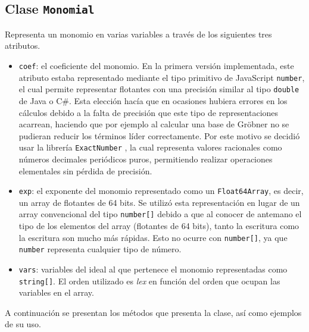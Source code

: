 \subsection{Clase \texttt{Monomial}}
Representa un monomio en varias variables a través de los siguientes tres atributos.
\begin{itemize}
    \item \texttt{coef}: el coeficiente del monomio. En la primera versión implementada, este atributo estaba representado mediante el tipo primitivo de JavaScript \texttt{number}, el cual permite representar flotantes con una precisión similar al tipo \texttt{double} de Java o C\#. Esta elección hacía que en ocasiones hubiera errores en los cálculos debido a la falta de precisión que este tipo de representaciones acarrean, haciendo que por ejemplo al calcular una base de Gröbner no se pudieran reducir los términos líder correctamente. Por este motivo se decidió usar la librería \texttt{ExactNumber} \cite{ExactNumber}, la cual representa valores racionales como números decimales periódicos puros, permitiendo realizar operaciones elementales sin pérdida de precisión.
    \item \texttt{exp}: el exponente del monomio representado como un \texttt{Float64Array}, es decir, un array de flotantes de 64 bits. Se utilizó esta representación en lugar de un array convencional del tipo \texttt{number[]} debido a que al conocer de antemano el tipo de los elementos del array (flotantes de 64 bits), tanto la escritura como la escritura son mucho más rápidas. Esto no ocurre con \texttt{number[]}, ya que \texttt{number} representa cualquier tipo de número.
    \item \texttt{vars}: variables del ideal al que pertenece el monomio representadas como \texttt{string[]}. El orden utilizado es \textit{lex} en función del orden que  ocupan las variables en el array.
\end{itemize}
A continuación se presentan los métodos que presenta la clase, así como ejemplos de su uso.


